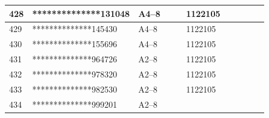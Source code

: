 \documentclass[UTF8,10pt,a4paper,fontset=fandol]{ctexart}
\newcommand{\fieldvalue}[1]{#1}
\begin{document}
\begin{center}
\begin{tabular}{|p{0.07\linewidth}|p{0.24\linewidth}|p{0.20\linewidth}|p{0.18\linewidth}|p{0.16\linewidth}|}
\fieldvalue{428} &
\fieldvalue{**************131048} &
\fieldvalue{A4--8} &
\fieldvalue{1122105} & \\
\hline
\fieldvalue{429} &
\fieldvalue{**************145430} &
\fieldvalue{A4--8} &
\fieldvalue{1122105} & \\
\hline
\fieldvalue{430} &
\fieldvalue{**************155696} &
\fieldvalue{A4--8} &
\fieldvalue{1122105} & \\
\hline
\fieldvalue{431} &
\fieldvalue{**************964726} &
\fieldvalue{A2--8} &
\fieldvalue{1122105} & \\
\hline
\fieldvalue{432} &
\fieldvalue{**************978320} &
\fieldvalue{A2--8} &
\fieldvalue{1122105} & \\
\hline
\fieldvalue{433} &
\fieldvalue{**************982530} &
\fieldvalue{A2--8} &
\fieldvalue{1122105} & \\
\hline
\fieldvalue{434} &
\fieldvalue{**************999201} &
\fieldvalue{A2--8} &

\end{tabular}
\end{center}
\end{document}
